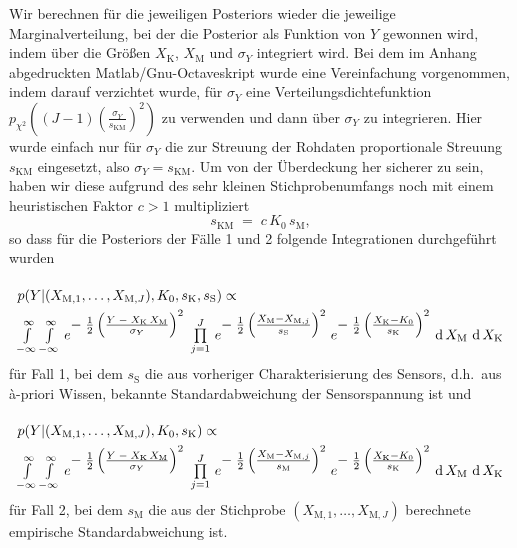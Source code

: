 Wir berechnen für die jeweiligen Posteriors wieder die jeweilige
Marginalverteilung, bei der die Posterior als
Funktion von $Y$ gewonnen wird, indem über die Größen $X_\mathrm{K}$, $X_\mathrm{M}$
und $\sigma_Y$ integriert wird. Bei dem im Anhang abgedruckten Matlab/Gnu-Octaveskript wurde
eine Vereinfachung vorgenommen, indem darauf verzichtet wurde, für $\sigma_Y$ eine
Verteilungsdichtefunktion $p_{\chi^2} ((J-1) \left(\frac{\sigma_Y}{s_\mathrm{KM}}\right)^2)$ zu
verwenden und dann über $\sigma_Y$ zu integrieren. Hier wurde einfach nur für $\sigma_Y$
die zur Streuung der Rohdaten proportionale Streuung $s_\mathrm{KM}$ eingesetzt, also
$\sigma_Y = s_\mathrm{KM}$. Um von der Überdeckung her sicherer zu sein, haben wir diese aufgrund des
sehr kleinen Stichprobenumfangs noch mit einem heuristischen Faktor $c > 1$ multipliziert
$$
s_\mathrm{KM} \; = \; c \, K_0 \, s_\mathrm{M} ,
$$
so dass für die Posteriors der Fälle 1 und 2 folgende Integrationen durchgeführt wurden
\begin{equation}
\arraycolsep=2.0pt\def\arraystretch{2.0}
\begin{array}{l}
p(Y | (X_{\mathrm{M},1}, \dots, X_{\mathrm{M},J}), K_0, s_\mathrm{K}, s_\mathrm{S}) \propto \\
\int\limits_{-\infty}^\infty \int\limits_{-\infty}^\infty \,
e^{\T-\;\frac{1}{2} \left(\frac{ Y \; - \; X_\mathrm{K} \, X_\mathrm{M}}{\sigma_Y} \right)^2}
\; \prod\limits_{j=1}^J  \,
e^{\T-\;\frac{1}{2} \left(\frac{ X_\mathrm{M} - X_{\mathrm{M},j} }{s_\mathrm{S}} \right)^2}
\;  e^{\T-\;\frac{1}{2} \left(\frac{X_\mathrm{K} - K_0}{s_\mathrm{K}} \right)^2}  \,
\operatorname{d}X_\mathrm{M} \, \operatorname{d}X_\mathrm{K}
\end{array}
\label{marginalPosteriorFall1}
\end{equation}
für Fall 1, bei dem $s_\mathrm{S}$ die aus vorheriger Charakterisierung des
Sensors, d.h.\ aus {\`a}-priori Wissen, bekannte Standardabweichung der Sensorspannung ist
und 
\begin{equation}
\arraycolsep=2.0pt\def\arraystretch{2.0}
\begin{array}{l}
p(Y | (X_{\mathrm{M},1}, \dots, X_{\mathrm{M},J}), K_0, s_\mathrm{K}) \propto \\
\int\limits_{-\infty}^\infty \int\limits_{-\infty}^\infty \,
e^{\T-\;\frac{1}{2} \left(\frac{ Y \; - \; X_\mathrm{K} \, X_\mathrm{M}}{\sigma_Y} \right)^2}
\;\prod\limits_{j=1}^J \,
 e^{\T-\;\frac{1}{2} \left(\frac{ X_\mathrm{M} - X_{\mathrm{M},j} }{s_\mathrm{M}} \right)^2}
\;  e^{\T-\;\frac{1}{2} \left(\frac{X_\mathrm{K} - K_0}{s_\mathrm{K}} \right)^2} \,
\operatorname{d}X_\mathrm{M} \, \operatorname{d}X_\mathrm{K}
\end{array}
\label{marginalPosteriorFall2}
\end{equation}
für Fall 2, bei dem $s_\mathrm{M}$ die aus der Stichprobe
$(X_{\mathrm{M},1}, \dots, X_{\mathrm{M},J})$ berechnete empirische
Standardabweichung ist.

